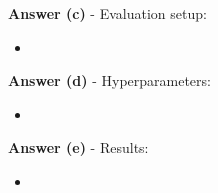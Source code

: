 \documentclass[a4paper,10pt]{article}
\begin{document}
\begin{enumerate}[topsep=0mm, partopsep=0mm, leftmargin=*]
\textbf{Answer (c)} - Evaluation setup:
\begin{itemize}
	\item 
\end{itemize}

\textbf{Answer (d)} - Hyperparameters:
\begin{itemize}
	\item 
\end{itemize}

\textbf{Answer (e)} - Results:
\begin{itemize}
	\item 
\end{itemize}


\end{enumerate}
\end{document}
